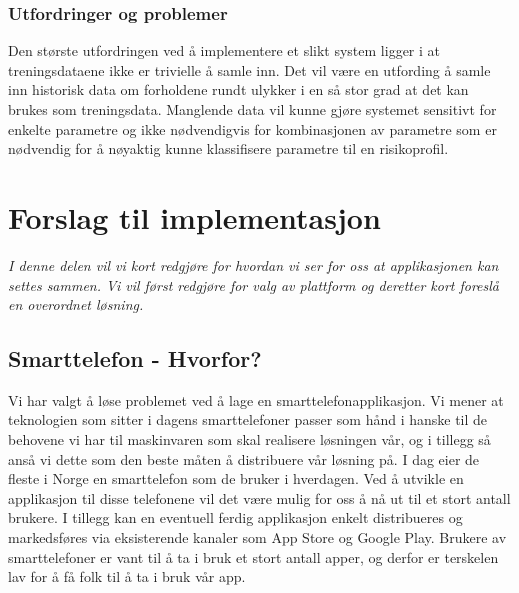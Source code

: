 \documentclass[a4paper,norsk,oneside]{book}
\begin{document}
\subsection{Utfordringer og problemer}
Den største utfordringen ved å implementere et slikt system ligger i at treningsdataene ikke er trivielle å samle inn. Det vil være en utfording å samle inn historisk data om forholdene rundt ulykker i en så stor grad at det kan brukes som treningsdata. Manglende data vil kunne gjøre systemet sensitivt for enkelte parametre og ikke nødvendigvis for kombinasjonen av parametre som er nødvendig for å nøyaktig kunne klassifisere parametre til en risikoprofil.  

\chapter{Forslag til implementasjon}
\label{cha:implementasjon}

{\it I denne delen vil vi kort redgjøre for hvordan vi ser for oss at applikasjonen kan settes sammen. Vi vil først redgjøre for valg av plattform og deretter kort foreslå en overordnet løsning.}

\section{Smarttelefon - Hvorfor?}
\label{sec:smarttelefon}

Vi har valgt å løse problemet ved å lage en smarttelefonapplikasjon. Vi mener at teknologien som sitter i dagens smarttelefoner passer som hånd i hanske til de behovene vi har til maskinvaren som skal realisere løsningen vår, og i tillegg så anså vi dette som den beste måten å distribuere vår løsning på. I dag eier de fleste i Norge en smarttelefon som de bruker i hverdagen. Ved å utvikle en applikasjon til disse telefonene vil det være mulig for oss å nå ut til et stort antall brukere. I tillegg kan en eventuell ferdig applikasjon enkelt distribueres og markedsføres via eksisterende kanaler som App Store og Google Play. Brukere av smarttelefoner er vant til å ta i bruk et stort antall apper, og derfor er terskelen lav for å få folk til å ta i bruk vår app.
\end{document}
